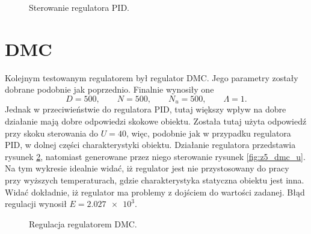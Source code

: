 \begin{figure}[tb]
\centering
{}
\caption{Sterowanie regulatora PID.}
\label{fig:z5_pid_u}
\end{figure}

\section{DMC}
Kolejnym testowanym regulatorem był regulator DMC. Jego parametry zostały dobrane
podobnie jak poprzednio. Finalnie wynosiły one
\begin{equation}
  D = 500, \qquad N = 500, \qquad N_u = 500, \qquad \Lambda = 1.
\end{equation}
Jednak w przeciwieństwie do regulatora PID, tutaj większy wpływ na dobre działanie
mają dobre odpowiedzi skokowe obiektu. Została tutaj użyta odpowiedź przy skoku
sterowania do $U = 40$, więc, podobnie jak w przypadku regulatora PID, w dolnej
części charakterystyki obiektu. Działanie regulatora przedstawia rysunek \ref{fig:z5_dmc},
natomiast generowane przez niego sterowanie rysunek \ref{fig:z5_dmc_u}. Na tym wykresie
idealnie widać, iż regulator jest nie przystosowany do pracy przy wyższych temperaturach,
gdzie charakterystyka statyczna obiektu jest inna. Widać dokładnie, iż regulator ma problemy
z dojściem do wartości zadanej. Błąd regulacji wynosił $E=\num{2,027e+3}$.


\begin{figure}[tb]
\centering
{}
\caption{Regulacja regulatorem DMC.}
\label{fig:z5_dmc}
\end{figure}

